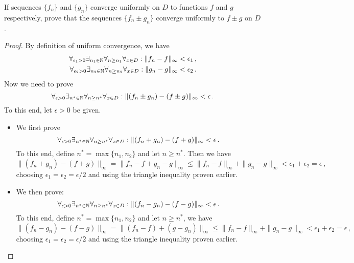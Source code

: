 \documentclass[week=10]{homework}
\begin{document}
\begin{questions}
		\question
		\begin{inlinetoprove}
			If sequences $\{f_n \}$ and $\{g_n \}$ converge uniformly on $D$ to functions $f$ and $g$ respectively, prove that the sequences $\{f_n \pm g_n \}$ converge uniformly to $f \pm g$ on $D$.
		\end{inlinetoprove}
		\begin{proof}
			By definition of uniform convergence, we have
			\begin{align*}
				\forall_{\epsilon_1 > 0}\exists_{n_1 \in \naturals}\forall_{n \geq n_1}\forall_{x\in D}: \|f_n - f\|_\infty &< \epsilon_1\,, \\
				\forall_{\epsilon_2 > 0}\exists_{n_2 \in \naturals}\forall_{n \geq n_2}\forall_{x\in D}: \|g_n - g\|_\infty &< \epsilon_2\,.
			\end{align*}
			Now we need to prove
			\[
				\forall_{\epsilon > 0}\exists_{n^* \in \naturals}\forall_{n \geq n^*}\forall_{x\in D}: \|(f_n \pm g_n) - (f \pm g)\|_\infty < \epsilon\,.
			\]
			To this end, let $\epsilon > 0$ be given.
			\begin{itemize}
				\item We first prove
				\[
				\forall_{\epsilon > 0}\exists_{n^* \in \naturals}\forall_{n \geq n^*}\forall_{x\in D}: \|(f_n + g_n) - (f + g)\|_\infty < \epsilon\,.
				\]
				To this end, define $n^* = \max\{n_1,n_2\}$ and let $n \ge n^*$. Then we have
				\[
					\|(f_n + g_n) - (f + g)\|_\infty = \|f_n - f + g_n - g\|_\infty \leq \| f_n - f\|_\infty + \| g_n - g \|_\infty < \epsilon_1 + \epsilon_2 = \epsilon\,,
				\]
				choosing $\epsilon_1 = \epsilon_2 = \epsilon/2$ and using the triangle inequality proven earlier.
				
				\item We then prove:
				\[
				\forall_{\epsilon > 0}\exists_{n^* \in \naturals}\forall_{n \geq n^*}\forall_{x\in D}: \|(f_n - g_n) - (f - g)\|_\infty < \epsilon\,.
				\]
				To this end, define $n^* = \max\{n_1,n_2\}$ and let $n \ge n^*$, we have
				\[
				\|(f_n - g_n) - (f - g)\|_\infty = \|(f_n - f )+ (g - g_n)\|_\infty \leq \| f_n - f\|_\infty + \| g_n - g \|_\infty < \epsilon_1 + \epsilon_2 = \epsilon\,,
				\]
				choosing $\epsilon_1 = \epsilon_2 = \epsilon/2$ and using the triangle inequality proven earlier.
			\end{itemize}
		\end{proof}
     \end{questions}
\end{document}
